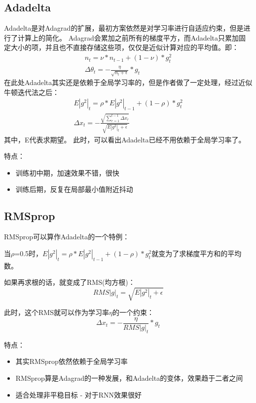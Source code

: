 \documentclass[hyperref, UTF-8]{ctexart}
\begin{document}
\subsection{Adadelta}
Adadelta是对Adagrad的扩展，最初方案依然是对学习率进行自适应约束，但是进行了计算上的简化。 Adagrad会累加之前所有的梯度平方，而Adadelta只累加固定大小的项，并且也不直接存储这些项，仅仅是近似计算对应的平均值。即：
\begin{eqnarray*}
n_t=\nu*n_{t-1}+(1-\nu)*g_t^2  \\
\Delta{\theta_t} = -\frac{\eta}{\sqrt{n_t+\epsilon}}*g_t 
\end{eqnarray*}
在此处Adadelta其实还是依赖于全局学习率的，但是作者做了一定处理，经过近似牛顿迭代法之后：
\begin{eqnarray*}
E|g^2|_t=\rho*E|g^2|_{t-1}+(1-\rho)*g_t^2  \\
\Delta{x_t}=-\frac{\sqrt{\sum_{r=1}^{t-1}\Delta{x_r}}}{\sqrt{E|g^2|_t+\epsilon}}
\end{eqnarray*}
其中，E代表求期望。
此时，可以看出Adadelta已经不用依赖于全局学习率了。 

特点：
\begin{itemize}
\item 训练初中期，加速效果不错，很快
\item 训练后期，反复在局部最小值附近抖动
\end{itemize}

\subsection{RMSprop}
RMSprop可以算作Adadelta的一个特例：

当$\rho$=0.5时，$E|g^2|_t=\rho*E|g^2|_{t-1}+(1-\rho)*g_t^2$就变为了求梯度平方和的平均数。

如果再求根的话，就变成了RMS(均方根)：
\begin{displaymath}
RMS|g|_t=\sqrt{E|g^2|_t+\epsilon}
\end{displaymath}

此时，这个RMS就可以作为学习率$\eta$的一个约束：
\begin{displaymath}
\Delta{x_t}=-\frac{\eta}{RMS|g|_t}*g_t
\end{displaymath}

特点：
\begin{itemize}
\item 其实RMSprop依然依赖于全局学习率
\item RMSprop算是Adagrad的一种发展，和Adadelta的变体，效果趋于二者之间
\item 适合处理非平稳目标 - 对于RNN效果很好
\end{itemize}
\end{document}
